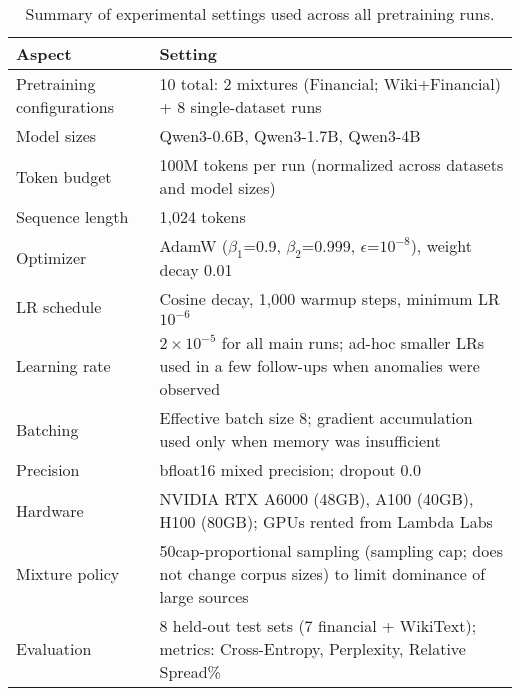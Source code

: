 \begin{table}[htbp]
\centering
\caption[Experimental Settings Summary]{Summary of experimental settings used across all pretraining runs.}
\label{tab:exp_settings}
\small
\begin{tabular}{p{3.8cm} p{9.5cm}}
\toprule
\textbf{Aspect} & \textbf{Setting} \\
\midrule
Pretraining configurations & 10 total: 2 mixtures (Financial; Wiki+Financial) + 8 single-dataset runs \\
Model sizes & Qwen3-0.6B, Qwen3-1.7B, Qwen3-4B \\
Token budget & 100M tokens per run (normalized across datasets and model sizes) \\
Sequence length & 1{,}024 tokens \\
Optimizer & AdamW ($\beta_1$=0.9, $\beta_2$=0.999, $\epsilon$=$10^{-8}$), weight decay 0.01 \\
LR schedule & Cosine decay, 1{,}000 warmup steps, minimum LR $10^{-6}$ \\
Learning rate & $2\times10^{-5}$ for all main runs; ad-hoc smaller LRs used in a few follow-ups when anomalies were observed \\
Batching & Effective batch size 8; gradient accumulation used only when memory was insufficient \\
Precision & bfloat16 mixed precision; dropout 0.0 \\
Hardware & NVIDIA RTX A6000 (48GB), A100 (40GB), H100 (80GB); GPUs rented from Lambda Labs \\
Mixture policy & 50cap-proportional sampling (sampling cap; does not change corpus sizes) to limit dominance of large sources \\
Evaluation & 8 held-out test sets (7 financial + WikiText); metrics: Cross-Entropy, Perplexity, Relative Spread\% \\
\bottomrule
\end{tabular}
\end{table}
